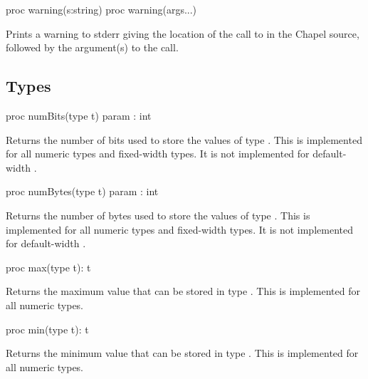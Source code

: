 \begin{protohead}
proc warning(s:string)
proc warning(args...)
\end{protohead}
\begin{protobody}
Prints a warning to stderr giving the location of the call to 
in the Chapel source, followed by the argument(s) to the call.
\end{protobody}

\subsection{Types}
\label{Types_standard_module}

\begin{protohead}
proc numBits(type t) param : int
\end{protohead}
\begin{protobody}
Returns the number of bits used to store the values of type .
This is implemented for all numeric types and fixed-width  types.
It is not implemented for default-width .
\end{protobody}


\begin{protohead}
proc numBytes(type t) param : int
\end{protohead}
\begin{protobody}
Returns the number of bytes used to store the values of type .
This is implemented for all numeric types and fixed-width  types.
It is not implemented for default-width .
\end{protobody}

\begin{protohead}
proc max(type t): t
\end{protohead}
\begin{protobody}
Returns the maximum value that can be stored in type .  This
is implemented for all numeric types.
\end{protobody}

\begin{protohead}
proc min(type t): t
\end{protohead}
\begin{protobody}
Returns the minimum value that can be stored in type .  This
is implemented for all numeric types.
\end{protobody}



